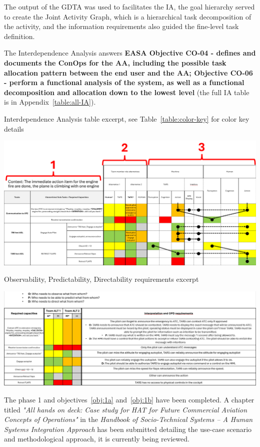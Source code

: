 \documentclass[12pt,a4paper]{article} %
\begin{document}
	The output of the GDTA was used to facilitates the IA, the goal hierarchy served to create the Joint Activity Graph, which is a hierarchical task decomposition of the activity, and the information requirements also guided the fine-level task definition. 
	
	The Interdependence Analysis answers \textbf{EASA Objective CO-04 - defines and documents the ConOps for the AA, including the possible task allocation pattern between the end user and the AA; Objective CO-06 - perform a functional analysis of the system, as well as a functional decomposition and allocation down to the lowest level} (the full IA table is in Appendix~\ref{table:all-IA}).
	
	\begin{table}[H]
		\centering
		\caption{Interdependence Analysis table excerpt, see Table~\ref{table:color-key} for color key details}
		\includegraphics[width=1\textwidth]{images/IA-table.png}
		\label{table:IA}
	\end{table}

	\begin{table}[H]
		\centering
		\caption{Observability, Predictability, Directability requirements excerpt}
		\includegraphics[width=1\textwidth]{images/OPD_table.png}
		\label{table:OPD}
	\end{table}

	The phase 1 and objectives~\ref{obj:1a} and~\ref{obj:1b} have been completed. A chapter titled \textit{"All hands on deck: Case study for HAT for Future Commercial Aviation Concepts of Operations"} in the \textit{Handbook of Socio-Technical Systems -- A Human Systems Integration Approach} has been submitted detailing the use-case scenario and methodological approach, it is currently being reviewed.
\end{document}
